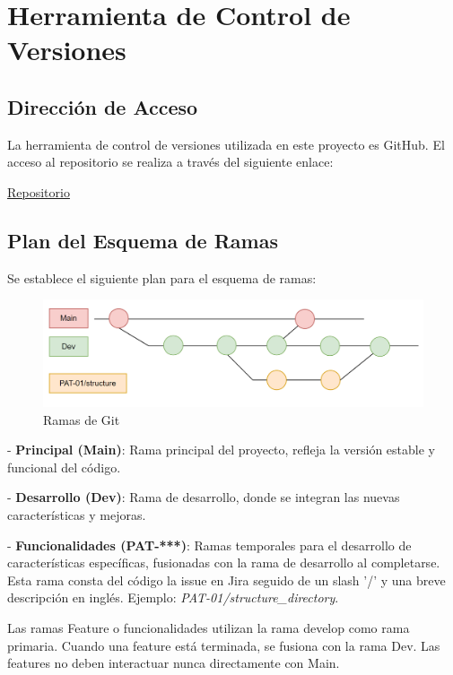 \section{Herramienta de Control de Versiones}

\subsection{Dirección de Acceso}\label{sec:repo-git}
La herramienta de control de versiones utilizada en este proyecto es GitHub. El acceso al repositorio se realiza a través del siguiente enlace:


\hyperlink{https://github.com/orgs/proyecto-patrocinio/repositories}{Repositorio}


\subsection{Plan del Esquema de Ramas}
Se establece el siguiente plan para el esquema de ramas:


\begin{figure}[h]
    \centering
    \includegraphics[width=1\linewidth]{fig/branches.png}
    \caption{Ramas de Git}
    \label{fig:enter-label}
\end{figure}


- \textbf{Principal (Main)}: Rama principal del proyecto, refleja la versión estable y funcional del código.
  
- \textbf{Desarrollo (Dev)}: Rama de desarrollo, donde se integran las nuevas características y mejoras.

- \textbf{Funcionalidades (PAT-***)}: Ramas temporales para el desarrollo de características específicas, fusionadas con la rama de desarrollo al completarse.
Esta rama consta del código la issue en Jira seguido de un slash '/' y una breve descripción en inglés. Ejemplo: \textit{PAT-01/structure\_directory}.

Las ramas Feature o funcionalidades utilizan la rama develop como rama primaria. Cuando una feature está terminada, se fusiona con la rama Dev. Las features no deben interactuar nunca directamente con Main.

